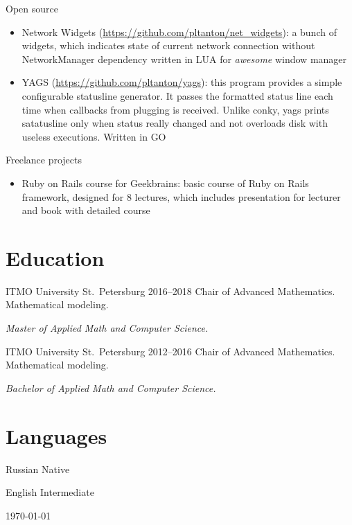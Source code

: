 \documentclass{cv}
\begin{document}
\vspace{2em}

\begin{cvblock}{Open source}
  \begin{itemize}
    \item Network Widgets
      (\url{https://github.com/pltanton/net_widgets}):
                        a bunch of widgets, which indicates state of current network connection
      without NetworkManager dependency written in LUA for
      \textit{awesome} window manager
    \item YAGS
      (\url{https://github.com/pltanton/yags}):
      this program provides a simple configurable statusline generator. It
      passes the formatted status line each time when callbacks from plugging
      is received. Unlike conky, yags prints satatusline only when status
      really changed and not overloads disk with useless executions. Written in
      GO

  \end{itemize}
\end{cvblock}

\vspace{2em}

\begin{cvblock}{Freelance projects}
  \begin{itemize}
    \item Ruby on Rails course for Geekbrains:
      basic course of Ruby on Rails framework, designed for 8 lectures, which
      includes presentation for lecturer and book with detailed course
  \end{itemize}
\end{cvblock}

\section{Education}

\begin{cvblock}{%
  \blocktitle
    {ITMO University}
    {St.~Petersburg}
    {}
    {2016--2018}}
  Chair of Advanced Mathematics. Mathematical modeling.
  \vspace{1em}

  \textit{Master of Applied Math and Computer Science.}
\end{cvblock}

\begin{cvblock}{%
  \blocktitle
    {ITMO University}
    {St.~Petersburg}
    {}
    {2012--2016}}
  Chair of Advanced Mathematics. Mathematical modeling.
  \vspace{1em}

  \textit{Bachelor of Applied Math and Computer Science.}
\end{cvblock}

\section{Languages}

\begin{cvblock}{Russian}
  Native
\end{cvblock}

\begin{cvblock}{English}
  Intermediate
\end{cvblock}

\vfill
\begin{center}
  \monthyear\today
\end{center}
\end{document}
